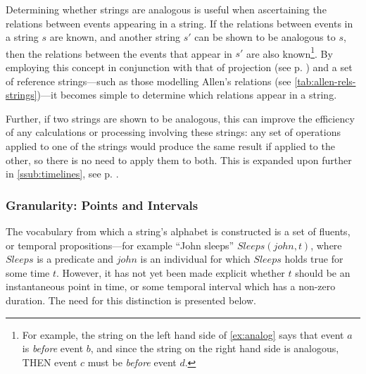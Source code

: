 \documentclass[a4paper,12pt,leqno]{article}
\begin{document}
Determining whether strings are analogous is useful when ascertaining the relations between events appearing in a string. If the relations between events in a string $s$ are known, and another string $s'$ can be shown to be analogous to $s$, then the relations between the events that appear in $s'$ are also known\footnote{For example, the string on the left hand side of \cref{ex:analog} says that event $a$ is \textit{before} event $b$, and since the string on the right hand side is analogous, THEN event $c$ must be \textit{before} event $d$.}. By employing this concept in conjunction with that of projection (see p. \pageref{para:str-op-projection}) and a set of reference strings---such as those modelling Allen's relations (see \cref{tab:allen-rels-strings})---it becomes simple to determine which relations appear in a string.

Further, if two strings are shown to be analogous, this can improve the efficiency of any calculations or processing involving these strings: any set of operations applied to one of the strings would produce the same result if applied to the other, so there is no need to apply them to both. This is expanded upon further in \cref{ssub:timelines}, see p. \pageref{ex:sp-analogy}.

\subsubsection{Granularity: Points and Intervals}\label{ssub:granularity}
The vocabulary from which a string's alphabet is constructed is a set of fluents, or temporal propositions---for example ``John sleeps'' $Sleeps(john, t)$, where $Sleeps$ is a predicate and $john$ is an individual for which $Sleeps$ holds true for some time $t$. However, it has not yet been made explicit whether $t$ should be an instantaneous point in time, or some temporal interval which has a non-zero duration. The need for this distinction is presented below.
\end{document}
